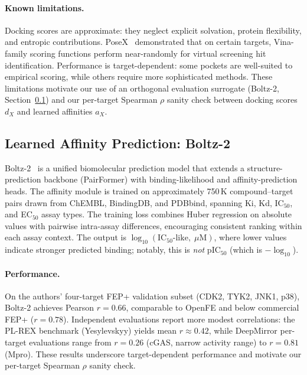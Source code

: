 \paragraph{Known limitations.}
Docking scores are approximate: they neglect explicit solvation,
protein flexibility, and entropic contributions.
PoseX~\citep{posex2025} demonstrated that on certain targets, Vina-family
scoring functions perform near-randomly for virtual screening hit
identification.
Performance is target-dependent: some pockets are well-suited to
empirical scoring, while others require more sophisticated methods.
These limitations motivate our use of an orthogonal evaluation
surrogate (Boltz-2, Section~\ref{sec:rw:boltz2}) and our per-target
Spearman $\rho$ sanity check between docking scores $d_X$ and
learned affinities $a_X$.

\subsection{Learned Affinity Prediction: Boltz-2}
\label{sec:rw:boltz2}

Boltz-2~\citep{passaro2025boltz2} is a unified biomolecular prediction
model that extends a structure-prediction backbone (PairFormer) with
binding-likelihood and affinity-prediction heads.
The affinity module is trained on approximately 750\,K compound--target
pairs drawn from ChEMBL, BindingDB, and PDBbind, spanning Ki, Kd,
IC$_{50}$, and EC$_{50}$ assay types.
The training loss combines Huber regression on absolute values with
pairwise intra-assay differences, encouraging consistent ranking
within each assay context.
The output is $\log_{10}(\text{IC}_{50}\text{-like},\;\mu\text{M})$,
where lower values indicate stronger predicted binding; notably, this
is \emph{not} pIC$_{50}$ (which is $-\log_{10}$).

\paragraph{Performance.}
On the authors' four-target FEP+ validation subset (CDK2, TYK2, JNK1,
p38), Boltz-2 achieves Pearson $r = 0.66$, comparable to OpenFE and
below commercial FEP+ ($r = 0.78$).
Independent evaluations report more modest correlations: the PL-REX
benchmark (Yesylevskyy) yields mean $r \approx 0.42$, while DeepMirror
per-target evaluations range from $r = 0.26$ (cGAS, narrow activity
range) to $r = 0.81$ (Mpro).
These results underscore target-dependent performance and motivate our
per-target Spearman $\rho$ sanity check.

